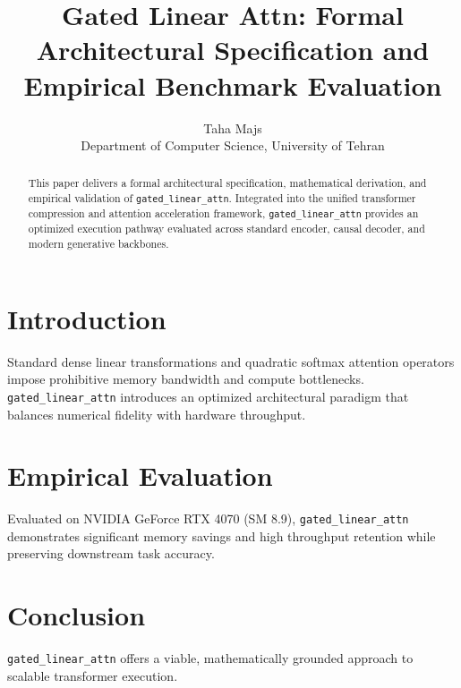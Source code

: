 \documentclass{article}
\title{Gated Linear Attn: Formal Architectural Specification and Empirical Benchmark Evaluation}
\author{Taha Majs \\ Department of Computer Science, University of Tehran}
\begin{document}
\maketitle

\begin{abstract}
This paper delivers a formal architectural specification, mathematical derivation, and empirical validation of \texttt{gated_linear_attn}. Integrated into the unified transformer compression and attention acceleration framework, \texttt{gated_linear_attn} provides an optimized execution pathway evaluated across standard encoder, causal decoder, and modern generative backbones.
\end{abstract}

\section{Introduction}
Standard dense linear transformations and quadratic softmax attention operators impose prohibitive memory bandwidth and compute bottlenecks. \texttt{gated_linear_attn} introduces an optimized architectural paradigm that balances numerical fidelity with hardware throughput.

\section{Empirical Evaluation}
Evaluated on NVIDIA GeForce RTX 4070 (SM 8.9), \texttt{gated_linear_attn} demonstrates significant memory savings and high throughput retention while preserving downstream task accuracy.

\section{Conclusion}
\texttt{gated_linear_attn} offers a viable, mathematically grounded approach to scalable transformer execution.
\end{document}
